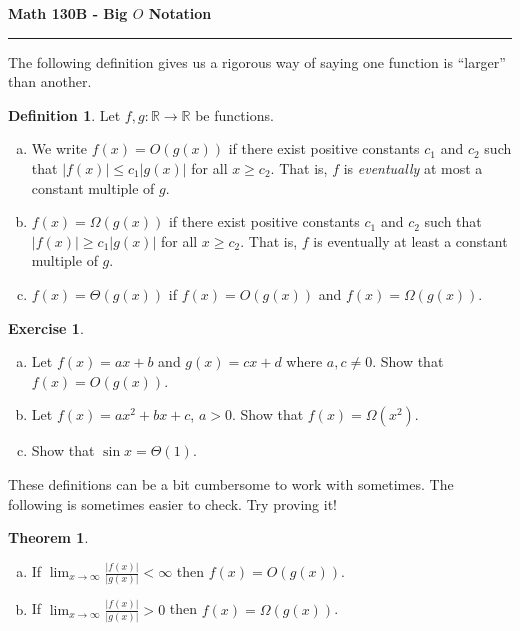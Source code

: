 \documentclass[11pt,letterpaper]{report}
\newcommand{\reals}{\mathbb{R}}
\theoremstyle{definition}
\newtheorem{definition}{Definition}
\newtheorem{exercise}{Exercise}
\newtheorem{theorem}{Theorem}
\begin{document}
\begin{center}
{\bf \Large Math 130B - Big $O$ Notation}
\vspace{0.2cm}
\hrule
\end{center}


The following definition gives us a rigorous way of saying one function is ``larger'' than another.
\begin{definition}
	Let $f,g:\reals\to \reals$ be functions.
	\begin{enumerate}[(a)]
		\item We write $f(x) = O(g(x))$ if there exist positive constants $c_1$ and $c_2$ such that $|f(x)| \leq c_1|g(x)|$ for all $x \geq c_2$. That is, $f$ is \textit{eventually} at most a constant multiple of $g$.
		\item $f(x) = \Omega(g(x))$ if there exist positive constants $c_1$ and $c_2$ such that $|f(x)| \geq c_1|g(x)|$ for all $x\geq c_2$. That is, $f$ is eventually at least a constant multiple of $g$.
		\item $f(x) = \Theta(g(x))$ if $f(x) = O(g(x))$ and $f(x) = \Omega(g(x))$. 
	\end{enumerate}
\end{definition}


\begin{exercise}
	\begin{enumerate}[(a)]
		\item Let $f(x) = ax+b$ and $g(x) = cx+d$ where $a,c\neq 0$. Show that $f(x) = O(g(x))$.
		\item Let $f(x) = ax^2+bx+c$, $a > 0$. Show that $f(x) = \Omega(x^2)$.
		\item Show that $\sin x = \Theta(1)$.
	\end{enumerate}
\end{exercise}

These definitions can be a bit cumbersome to work with sometimes. The following is sometimes easier to check. Try proving it!

\begin{theorem}
	\begin{enumerate}[(a)]
		\item If $\lim_{x\to \infty}\frac{|f(x)|}{|g(x)|}<\infty$ then $f(x) = O(g(x))$.
		\item If $\lim_{x\to \infty}\frac{|f(x)|}{|g(x)|} > 0$ then $f(x) = \Omega(g(x))$.
	\end{enumerate}
\end{theorem}
\end{document}
